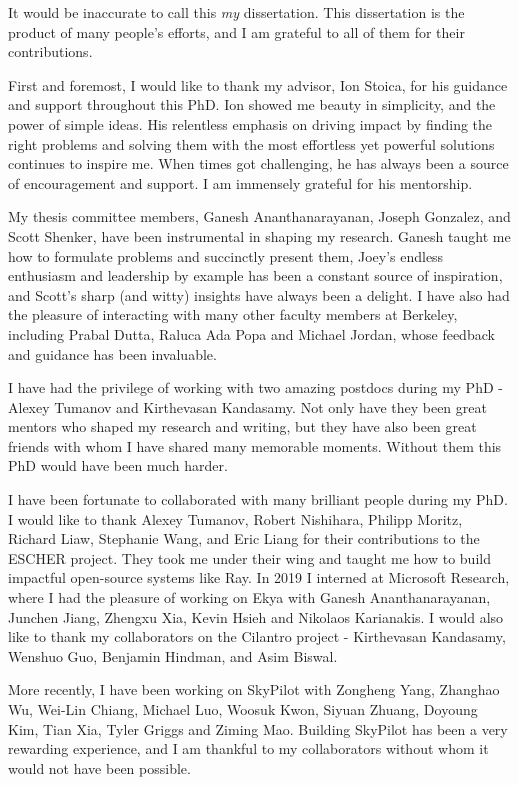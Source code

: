 \begin{acknowledgements}

It would be inaccurate to call this \textit{my} dissertation. This dissertation is the product of many people's efforts, and I am grateful to all of them for their contributions.

First and foremost, I would like to thank my advisor, Ion Stoica, for his guidance and support throughout this PhD. Ion showed me beauty in simplicity, and the power of simple ideas. His relentless emphasis on driving impact by finding the right problems and solving them with the most effortless yet powerful solutions continues to inspire me. When times got challenging, he has always been a source of encouragement and support. I am immensely grateful for his mentorship.

My thesis committee members, Ganesh Ananthanarayanan, Joseph Gonzalez, and Scott Shenker, have been instrumental in shaping my research. Ganesh taught me how to formulate problems and succinctly present them, Joey's endless enthusiasm and leadership by example has been a constant source of inspiration, and Scott's sharp (and witty) insights have always been a delight. I have also had the pleasure of interacting with many other faculty members at Berkeley, including Prabal Dutta, Raluca Ada Popa and Michael Jordan, whose feedback and guidance has been invaluable.

I have had the privilege of working with two amazing postdocs during my PhD - Alexey Tumanov and Kirthevasan Kandasamy. Not only have they been great mentors who shaped my research and writing, but they have also been great friends with whom I have shared many memorable moments. Without them this PhD would have been much harder.

I have been fortunate to collaborated with many brilliant people during my PhD. I would like to thank Alexey Tumanov, Robert Nishihara, Philipp Moritz, Richard Liaw, Stephanie Wang, and Eric Liang for their contributions to the ESCHER project. They took me under their wing and taught me how to build impactful open-source systems like Ray. In 2019 I interned at Microsoft Research, where I had the pleasure of working on Ekya with Ganesh Ananthanarayanan, Junchen Jiang, Zhengxu Xia, Kevin Hsieh and Nikolaos Karianakis. I would also like to thank my collaborators on the Cilantro project - Kirthevasan Kandasamy, Wenshuo Guo, Benjamin Hindman, and Asim Biswal. 

More recently, I have been working on SkyPilot with Zongheng Yang, Zhanghao Wu, Wei-Lin Chiang, Michael Luo, Woosuk Kwon, Siyuan Zhuang, Doyoung Kim, Tian Xia, Tyler Griggs and Ziming Mao. Building SkyPilot has been a very rewarding experience, and I am thankful to my collaborators without whom it would not have been possible.


\end{acknowledgements}
